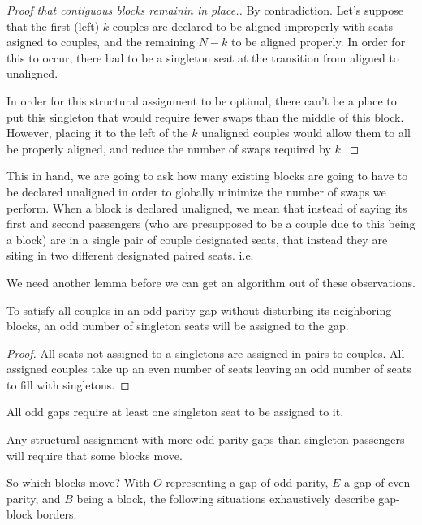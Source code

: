 \documentclass[11pt,twocolumn]{article}
\begin{document}
\begin{proof}[Proof that contiguous blocks remainin in place.]
By contradiction.  Let's suppose that the first (left) $k$ couples are declared to be aligned improperly with seats asigned to couples, and the remaining $N-k$ to be aligned properly.  In order for this to occur, there had to be a singleton seat at the transition from aligned to unaligned.  

In order for this structural assignment to be optimal, there can't be a place to put this singleton that would require fewer swaps than the middle of this block.  However, placing it to the left of the $k$ unaligned couples would allow them to all be properly aligned, and reduce the number of swaps required by $k$.
\end{proof}

This in hand, we are going to ask how many existing blocks are going to have to be declared unaligned in order to globally minimize the number of swaps we perform. When a block is declared unaligned, we mean that instead of saying its first and second passengers (who are presupposed to be a couple due to this being a block) are in a single pair of couple designated seats, that instead they are siting in two different designated paired seats.  i.e.


We need another lemma before we can get an algorithm out of these observations.

\begin{lem} \label{lem:oddGapsNeedSingletons}
To satisfy all couples in an odd parity gap without disturbing its neighboring blocks, an odd number of singleton seats will be assigned to the gap.
\end{lem}

\begin{proof}
All seats not assigned to a singletons are assigned in pairs to couples.  All assigned couples take up an even number of seats leaving an odd number of seats to fill with singletons.
\end{proof}

\begin{cor}
All odd gaps require at least one singleton seat to be assigned to it.
\end{cor}

\begin{cor}
Any structural assignment with more odd parity gaps than singleton passengers will require that some blocks move.
\end{cor}

So which blocks move?  With $O$ representing a gap of odd parity, $E$ a gap of even parity, and $B$ being a block, the following situations exhaustively describe gap-block borders:
\end{document}
